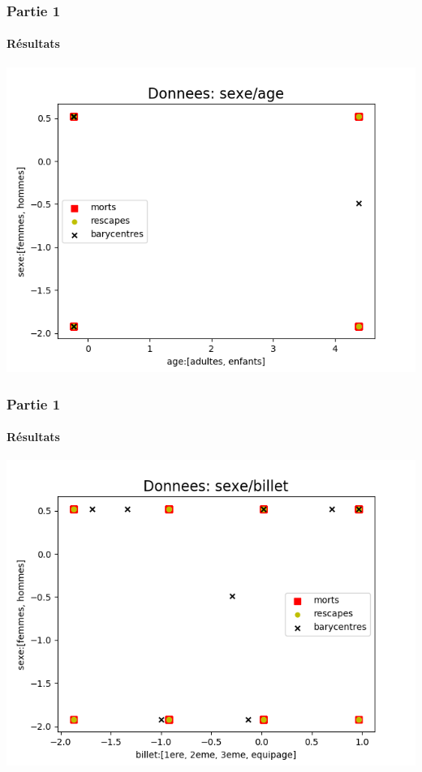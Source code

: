 \documentclass{beamer}
\begin{document}
    \begin{frame}[fragile]
        \frametitle{Partie 1}
        \framesubtitle{Résultats}
        \includegraphics[scale=0.6]{p1-4}
    \end{frame}
    
    \begin{frame}[fragile]
        \frametitle{Partie 1}
        \framesubtitle{Résultats}
        \includegraphics[scale=0.6]{p1-5}
    \end{frame}
    
\end{document}
